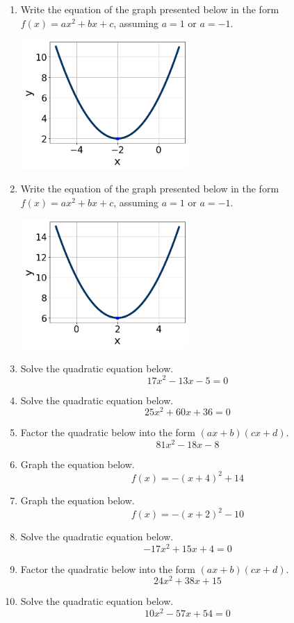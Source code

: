\documentclass[14pt]{extbook}
\begin{document}
\begin{enumerate}
\item{
Write the equation of the graph presented below in the form $f(x)=ax^2+bx+c$, assuming  $a=1$ or $a=-1$.
\begin{center}
    \includegraphics[width=0.5\textwidth]{../Figures/quadraticGraphToEquationCopyA.png}
\end{center}
} \newpage
\item{
Write the equation of the graph presented below in the form $f(x)=ax^2+bx+c$, assuming  $a=1$ or $a=-1$.
\begin{center}
    \includegraphics[width=0.5\textwidth]{../Figures/quadraticGraphToEquationA.png}
\end{center}
} \newpage
\item{
Solve the quadratic equation below.\[ 17x^{2} -13 x -5 = 0 \]} \newpage
\item{
Solve the quadratic equation below.\[ 25x^{2} +60 x + 36 = 0 \]} \newpage
\item{
Factor the quadratic below into the form $(ax+b)(cx+d)$.\[ 81x^{2} -18 x -8 \]} \newpage
\item{
Graph the equation below.\[ f(x) = -(x+4)^2 + 14 \]} \newpage
\item{
Graph the equation below.\[ f(x) = -(x+2)^2 - 10 \]} \newpage
\item{
Solve the quadratic equation below.\[ -17x^{2} +15 x + 4 = 0 \]} \newpage
\item{
Factor the quadratic below into the form $(ax+b)(cx+d)$.\[ 24x^{2} +38 x + 15 \]} \newpage
\item{
Solve the quadratic equation below.\[ 10x^{2} -57 x + 54 = 0 \]} \newpage
\end{enumerate}
\end{document}
